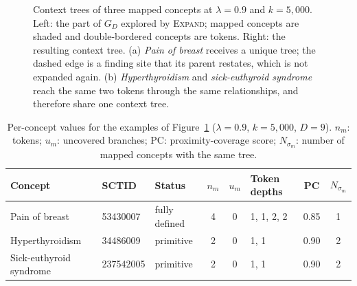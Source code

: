 \begin{figure}[t]
\caption{Context trees of three mapped concepts at $\lambda = 0.9$ and $k = 5{,}000$. Left: the part of $G_D$ explored by \textsc{Expand}; mapped concepts are shaded and double-bordered concepts are tokens. Right: the resulting context tree. (a) \textit{Pain of breast} receives a unique tree; the dashed edge is a finding site that its parent restates, which is not expanded again. (b) \textit{Hyperthyroidism} and \textit{sick-euthyroid syndrome} reach the same two tokens through the same relationships, and therefore share one context tree.}
\label{fig:example-trees}
\end{figure}

\begin{table}[t]
\centering
\small
\caption{Per-concept values for the examples of Figure~\ref{fig:example-trees} ($\lambda = 0.9$, $k = 5{,}000$, $D = 9$). $n_m$: tokens; $u_m$: uncovered branches; PC: proximity-coverage score; $N_{\sigma_m}$: number of mapped concepts with the same tree.}
\label{tab:example-trees}
\begin{tabular}{@{}lllcclcc@{}}
\toprule
Concept & SCTID & Status & $n_m$ & $u_m$ & Token depths & PC & $N_{\sigma_m}$ \\
\midrule
Pain of breast          & 53430007  & fully defined & 4 & 0 & 1, 1, 2, 2 & 0.85 & 1 \\
Hyperthyroidism         & 34486009  & primitive     & 2 & 0 & 1, 1       & 0.90 & 2 \\
Sick-euthyroid syndrome & 237542005 & primitive     & 2 & 0 & 1, 1       & 0.90 & 2 \\
\bottomrule
\end{tabular}
\end{table}

